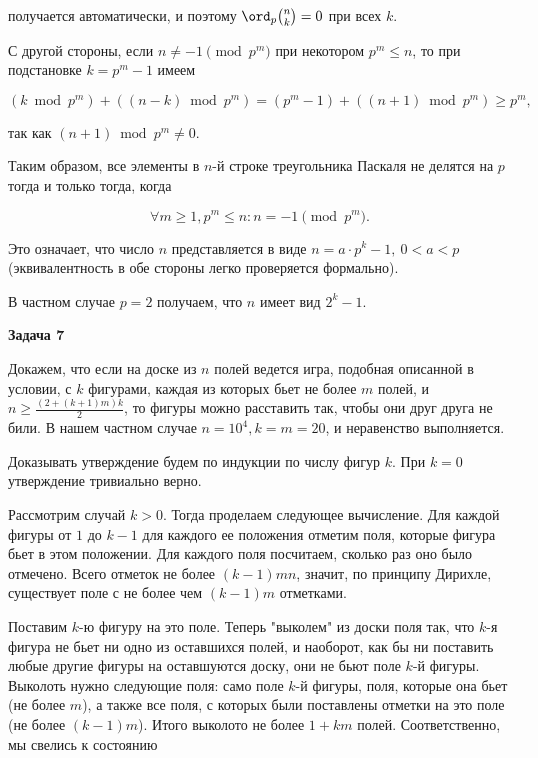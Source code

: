 		получается автоматически, и поэтому $\ord_p \binom{n}{k} = 0$ при всех $k$.

		С другой стороны, если $n \ne -1 \pmod{p^m}$ при некотором $p^m \le n$, то при подстановке $k = p^m - 1$ имеем

		\begin{equation*}
			(k \bmod p^m) + ((n-k) \bmod p^m) = (p^m-1) + ((n+1) \bmod p^m) \ge p^m,
		\end{equation*}

		так как $(n+1) \bmod p^m \ne 0$.

		Таким образом, все элементы в $n$-й строке треугольника Паскаля не делятся на $p$ тогда и только тогда, когда

		\begin{equation*}
			\forall m \ge 1, p^m \le n: n = -1 \pmod{p^m}.
		\end{equation*}

		Это означает, что число $n$ представляется в виде $n = a \cdot p^k - 1, \ 0 < a < p$ (эквивалентность в обе стороны легко проверяется формально).

		В частном случае $p = 2$ получаем, что $n$ имеет вид $2^k - 1$.


	\begin{center}
    \textbf{Задача 7}
\end{center}
		Докажем, что если на доске из $n$ полей ведется игра, подобная описанной в условии, с $k$ фигурами, каждая из которых бьет не более $m$ полей, и $n \ge \frac{(2+(k+1)m)k}{2}$, то фигуры можно расставить так, чтобы они друг друга не били. В нашем частном случае $n = 10^4, k = m = 20$, и неравенство выполняется.

		Доказывать утверждение будем по индукции по числу фигур $k$. При $k = 0$ утверждение тривиально верно.

		Рассмотрим случай $k > 0$. Тогда проделаем следующее вычисление. Для каждой фигуры от $1$ до $k-1$ для каждого ее положения отметим поля, которые фигура бьет в этом положении. Для каждого поля посчитаем, сколько раз оно было отмечено. Всего отметок не более $(k-1)mn$, значит, по принципу Дирихле, существует поле с не более чем $(k-1)m$ отметками.

		Поставим $k$-ю фигуру на это поле. Теперь "выколем" из доски поля так, что $k$-я фигура не бьет ни одно из оставшихся полей, и наоборот, как бы ни поставить любые другие фигуры на оставшуются доску, они не бьют поле $k$-й фигуры. Выколоть нужно следующие поля: само поле $k$-й фигуры, поля, которые она бьет (не более $m$), а также все поля, с которых были поставлены отметки на это поле (не более $(k-1)m$). Итого выколото не более $1+km$ полей. Соответственно, мы свелись к состоянию

